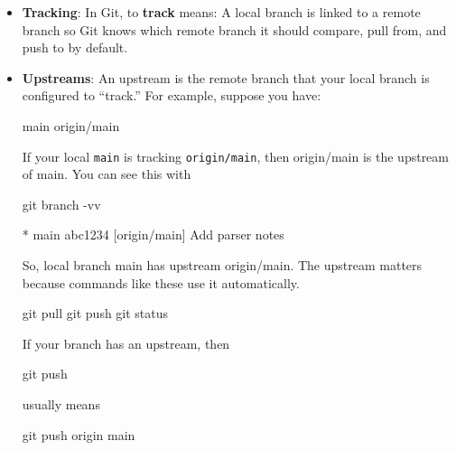 \documentclass{report}
\begin{document}
\begin{itemize}
            \bigbreak \noindent 
            \begin{bashcode}
                git log -p
            \end{bashcode}
            \bigbreak \noindent 
            Show summary of changed files:
            \begin{bashcode}
                git log --stat
            \end{bashcode}
        \item \textbf{Tracking}: In Git, to \textbf{track} means: A local branch is linked to a remote branch so Git knows which remote branch it should compare, pull from, and push to by default.
        \item \textbf{Upstreams}: An upstream is the remote branch that your local branch is configured to “track.”
            \bigbreak \noindent 
            For example, suppose you have:
            \bigbreak \noindent 
            \begin{bashcode}
                main
                origin/main
            \end{bashcode}
            \bigbreak \noindent 
            If your local \texttt{main} is tracking \texttt{origin/main}, then origin/main is the upstream of main. You can see this with
            \bigbreak \noindent 
            \begin{bashcode}
                git branch -vv
            \end{bashcode}
            \bigbreak \noindent 
            \begin{bashcode}
                * main  abc1234 [origin/main] Add parser notes
            \end{bashcode}
            \bigbreak \noindent 
            So,  local branch main has upstream origin/main. The upstream matters because commands like these use it automatically.
            \bigbreak \noindent 
            \begin{bashcode}
                git pull
                git push 
                git status
            \end{bashcode}
            \bigbreak \noindent 
            If your branch has an upstream, then
            \bigbreak \noindent 
            \begin{bashcode}
                git push
            \end{bashcode}
            \bigbreak \noindent 
            usually means
            \bigbreak \noindent 
            \begin{bashcode}
                git push origin main

\end{bashcode}
\end{itemize}
\end{document}
